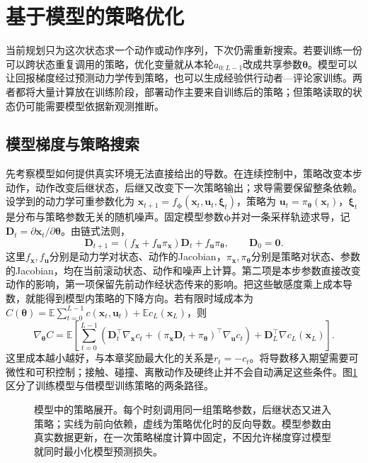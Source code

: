 \section{基于模型的策略优化}
\label{sec:rl-learning-model-policy}

当前规划只为这次状态求一个动作或动作序列，下次仍需重新搜索。若要训练一份可以跨状态重复调用的策略，优化变量就从本轮$a_{0:L-1}$改成共享参数$\bm\theta$。模型可以让回报梯度经过预测动力学传到策略，也可以生成经验供行动者—评论家训练。两者都将大量计算放在训练阶段，部署动作主要来自训练后的策略；但策略读取的状态仍可能需要模型依据新观测推断。

\subsection{模型梯度与策略搜索}
\label{sec:rl-learning-model-gradient}

先考察模型如何提供真实环境无法直接给出的导数。在连续控制中，策略改变本步动作，动作改变后继状态，后继又改变下一次策略输出；求导需要保留整条依赖。设学到的动力学可重参数化为
$\bm x_{t+1}=f_{\bm\phi}(\bm x_t,\bm u_t,\bm\xi_t)$，策略为
$\bm u_t=\pi_{\bm\theta}(\bm x_t)$，$\bm\xi_t$是分布与策略参数无关的随机噪声。固定模型参数$\bm\phi$并对一条采样轨迹求导，记
$\bm D_t=\partial\bm x_t/\partial\bm\theta$。由链式法则，
\begin{equation}
  \bm D_{t+1}
   =\left(f_{\bm x}+f_{\bm u}\pi_{\bm x}\right)\bm D_t
       +f_{\bm u}\pi_{\bm\theta},\qquad \bm D_0=\bm0.
  \label{eq:rl-learning-model-chain}
\end{equation}
这里$f_{\bm x},f_{\bm u}$分别是动力学对状态、动作的Jacobian，$\pi_{\bm x},\pi_{\bm\theta}$分别是策略对状态、参数的Jacobian，均在当前滚动状态、动作和噪声上计算。第二项是本步参数直接改变动作的影响，第一项保留先前动作经状态传来的影响。把这些敏感度乘上成本导数，就能得到模型内策略的下降方向。若有限时域成本为
$C(\bm\theta)=\mathbb E\sum_{t=0}^{L-1}c(\bm x_t,\bm u_t)+
\mathbb E c_L(\bm x_L)$，则
\[
 \nabla_{\bm\theta}C
  =\mathbb E\left[
    \sum_{t=0}^{L-1}
      \left(\bm D_t^\top\nabla_{\bm x}c_t+
       (\pi_{\bm x}\bm D_t+\pi_{\bm\theta})^\top
                                       \nabla_{\bm u}c_t\right)
          +\bm D_L^\top\nabla c_L(\bm x_L)\right].
\]
这里成本越小越好，与本章奖励最大化的关系是$r_t=-c_t$。将导数移入期望需要可微性和可积控制；接触、碰撞、离散动作及硬终止并不会自动满足这些条件。图\ref{fig:rl-learning-model-gradient}区分了训练模型与借模型训练策略的两条路径。

\begin{figure}[t]
  \centering
  
  \caption{模型中的策略展开。每个时刻调用同一组策略参数，后继状态又进入策略；实线为前向依赖，虚线为策略优化时的反向导数。模型参数由真实数据更新，在一次策略梯度计算中固定，不因允许梯度穿过模型就同时最小化模型预测损失。}
  \label{fig:rl-learning-model-gradient}
\end{figure}

